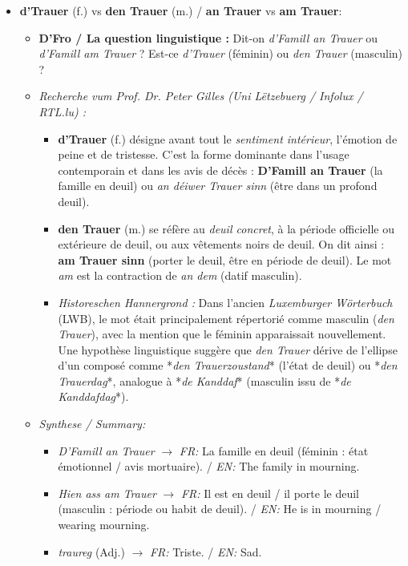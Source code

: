 \begin{itemize}
    \vspace{0.6em}

    \item \textbf{d'Trauer} (f.) vs \textbf{den Trauer} (m.) / \textbf{an Trauer} vs \textbf{am Trauer}:
    \begin{itemize}
        \item \textbf{D'Fro / La question linguistique :} Dit-on \textit{d'Famill an Trauer} ou \textit{d'Famill am Trauer} ? Est-ce \textit{d'Trauer} (féminin) ou \textit{den Trauer} (masculin) ?
        \item \textit{Recherche vum Prof. Dr. Peter Gilles (Uni Lëtzebuerg / Infolux / RTL.lu) :}
        \begin{itemize}
            \item \textbf{d'Trauer} (f.) désigne avant tout le \textit{sentiment intérieur}, l'émotion de peine et de tristesse. C'est la forme dominante dans l'usage contemporain et dans les avis de décès : \textbf{D'Famill an Trauer} (la famille en deuil) ou \textit{an déiwer Trauer sinn} (être dans un profond deuil).
            \item \textbf{den Trauer} (m.) se réfère au \textit{deuil concret}, à la période officielle ou extérieure de deuil, ou aux vêtements noirs de deuil. On dit ainsi : \textbf{am Trauer sinn} (porter le deuil, être en période de deuil). Le mot \textit{am} est la contraction de \textit{an dem} (datif masculin).
            \item \textit{Historeschen Hannergrond :} Dans l'ancien \textit{Luxemburger Wörterbuch} (LWB), le mot était principalement répertorié comme masculin (\textit{den Trauer}), avec la mention que le féminin apparaissait nouvellement. Une hypothèse linguistique suggère que \textit{den Trauer} dérive de l'ellipse d'un composé comme *\textit{den Trauerzoustand}* (l'état de deuil) ou *\textit{den Trauerdag}*, analogue à *\textit{de Kanddaf}* (masculin issu de *\textit{de Kanddafdag}*).
        \end{itemize}
        \item \textit{Synthese / Summary:}
        \begin{itemize}
            \item \textit{D'Famill an Trauer} $\rightarrow$ \textit{FR:} La famille en deuil (féminin : état émotionnel / avis mortuaire). / \textit{EN:} The family in mourning.
            \item \textit{Hien ass am Trauer} $\rightarrow$ \textit{FR:} Il est en deuil / il porte le deuil (masculin : période ou habit de deuil). / \textit{EN:} He is in mourning / wearing mourning.
            \item \textit{traureg} (Adj.) $\rightarrow$ \textit{FR:} Triste. / \textit{EN:} Sad.
        \end{itemize}
    \end{itemize}
\end{itemize}

